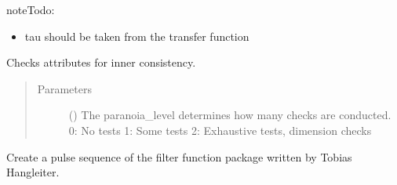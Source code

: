 \documentclass[letterpaper,10pt,english]{sphinxmanual}
\begin{document}
\begin{fulllineitems}
\begin{sphinxadmonition}{note}{\label{\detokenize{qsim:id42}}Todo:}
\begin{itemize}
\begin{description}
\end{description}

\item {} 
tau should be taken from the transfer function

\end{itemize}
\end{sphinxadmonition}

\begin{fulllineitems}
\label{\detokenize{qsim:qsim.solver_algorithms.Solver.consistency_checks}}
Checks attributes for inner consistency.
\begin{quote}\begin{description}
\item[{Parameters}] \leavevmode
{} () \textendash{} The paranoia\_level determines how many checks are conducted.
0: No tests
1: Some tests
2: Exhaustive tests, dimension checks

\end{description}\end{quote}

\end{fulllineitems}


\begin{fulllineitems}
\label{\detokenize{qsim:qsim.solver_algorithms.Solver.create_pulse_sequence}}
Create a pulse sequence of the filter function package written by
Tobias Hangleiter.


\end{fulllineitems}
\end{fulllineitems}
\end{document}
